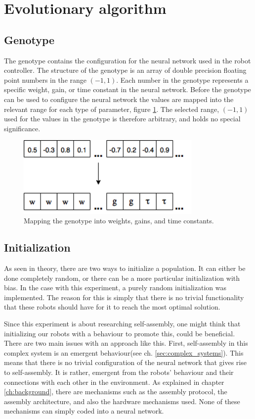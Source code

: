 \section{Evolutionary algorithm}
\subsection{Genotype}
\label{sec:genotype}
The genotype contains the configuration for the neural network used in the robot controller.
The structure of the genotype is an array of double precision floating point numbers in the range $(-1, 1)$.
Each number in the genotype represents a specific weight, gain, or time constant in the neural network.
Before the genotype can be used to configure the neural network the values are mapped into the relevant range for each type of parameter, figure \ref{fig:genotype-mapping}.
The selected range, $(-1, 1)$ used for the values in the genotype is therefore arbitrary, and holds no special significance. 
		
\begin{figure}[H]		
	\centering
	\includegraphics[width=0.80\textwidth, clip]{chapters/res/genotype_translation.png}
	\caption{Mapping the genotype into weights, gains, and time constants.}
	\label{fig:genotype-mapping}
\end{figure}

\subsection{Initialization}
As seen in theory, there are two ways to initialize a population. 
It can either be done completely random, or there can be a more particular initialization with bias. 
In the case with this experiment, a purely random initialization was implemented.
The reason for this is simply that there is no trivial functionality that these robots should have for it to reach the most optimal solution.

Since this experiment is about researching self-assembly, one might think that initializing our robots with a behaviour to promote this, could be beneficial.
There are two main issues with an approach like this.
First, self-assembly in this complex system is an emergent behaviour(see ch. \ref{sec:complex_systems}).
This means that there is no trivial configuration of the neural network that gives rise to self-assembly.
It is rather, emergent from the robots' behaviour and their connections with each other in the environment.
As explained in chapter \ref{ch:background}, there are mechanisms such as the assembly protocol, the assembly architecture, and also the hardware mechanisms used.
None of these mechanisms can simply coded into a neural network.

